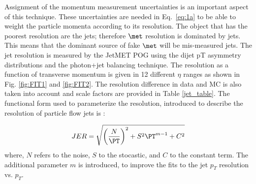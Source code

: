 Assignment of the momentum measurement uncertainties is an important aspect of this technique. These uncertainties are needed in Eq.~\ref{eq:1a} to be able to weight the particle momenta according to its resolution. The object that has the poorest resolution are the jets; therefore ${\met}$ resolution is dominated by jets. This means that the dominant source of  fake ${\met}$  will be mis-measured jets. The jet resolution is measured by the JetMET POG using the dijet pT asymmetry distributions and the photon+jet balancing technique. The resolution as a function of transverse momentum is given in 12 different $\eta$ ranges as shown in Fig. \ref{fig:FIT1} and \ref{fig:FIT2}. The resolution difference in data and MC is also taken into account and scale factors are provided in Table \ref{jet_table}. The functional form used to parameterize the resolution, introduced to describe the resolution of particle flow jets is \cite{jetreso}:

\begin{equation}\label{eq:jetreso}
JER = \sqrt{\left(\frac{N}{\PT}\right)^2 + S^2 \PT^{m-1} + C^2 } 
\end{equation}
where, $N$ refers to the noise, $S$ to the stocastic, and $C$ to the constant term. The additional parameter $m$ is introduced, to improve the fits to the jet $p_T$ resolution vs. $p_T$.



